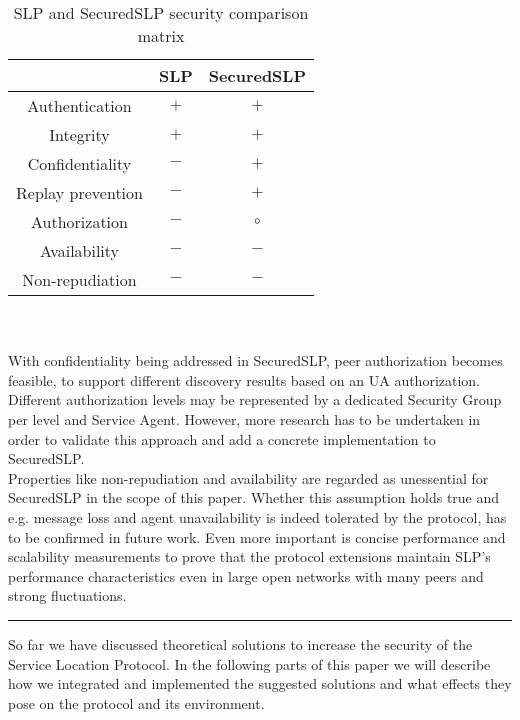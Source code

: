 \begin{table}[!h]
\begin{centering}
\begin{tabular}{|c|c|c|}
\hline 
 & SLP & SecuredSLP
\tabularnewline
\hline
\hline 
Authentication & $+$ & $+$
\tabularnewline
\hline 
Integrity & $+$ & $+$
\tabularnewline
\hline 
Confidentiality & $-$ & $+$
\tabularnewline
\hline 
Replay prevention & $-$ & $+$
\tabularnewline
\hline 
Authorization & $-$ & $\circ$
\tabularnewline
\hline 
Availability & $-$ & $-$
\tabularnewline
\hline 
Non-repudiation & $-$ & $-$
\tabularnewline
\hline
\end{tabular}
\par\end{centering}

\caption{\label{tab:SLP-and-SecuredSLP}SLP and SecuredSLP security comparison matrix}
\end{table}\\\\
With confidentiality being addressed in SecuredSLP, peer authorization becomes feasible, to support different discovery results based on an UA authorization. Different authorization levels may be represented by a dedicated Security Group per level and Service Agent. However, more research has to be undertaken in order to validate this approach and add a concrete implementation to SecuredSLP.\\
Properties like non-repudiation and availability are regarded as unessential for SecuredSLP in the scope of this paper. Whether this assumption holds true and e.g. message loss and agent unavailability is indeed tolerated by the protocol, has to be confirmed in future work. Even more important is concise performance and scalability measurements to prove that the protocol extensions maintain SLP's performance characteristics even in large open networks with many peers and strong fluctuations.\\
\hrule
So far we have discussed theoretical solutions to increase the security of the Service Location Protocol. In the following parts of this paper we will describe how we integrated and implemented the suggested solutions and what effects they pose on the protocol and its environment.